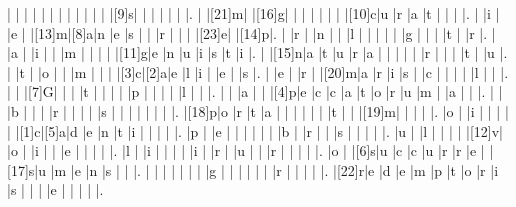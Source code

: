 \documentclass[12pt]{article}
\begin{document}
\begin{Puzzle}{20}{20}
  |{}  |{}  |{}  |{}  |{}  |{}  |{}  |{}  |{}  |{}  |{}  |{}  |[9]s|{}  |{}  |{}  |{}  |{}  |{}  |.
  |{}  |[21]m|{}  |[16]g|{}  |{}  |{}  |{}  |{}  |{}  |{}  |[10]c|u   |r   |a   |t   |{}  |{}  |{}  |.
  |{}  |i   |{}  |e   |{}  |[13]m|[8]a|n   |e   |s   |{}  |{}  |r   |{}  |{}  |{}  |[23]e|{}  |[14]p|.
  |{}  |r   |{}  |n   |{}  |{}  |l   |{}  |{}  |{}  |{}  |{}  |g   |{}  |{}  |{}  |t   |{}  |r   |.
  |{}  |a   |{}  |i   |{}  |{}  |m   |{}  |{}  |{}  |{}  |[11]g|e   |n   |u   |i   |s   |t   |i   |.
  |{}  |[15]n|a   |t   |u   |r   |a   |{}  |{}  |{}  |{}  |{}  |r   |{}  |{}  |{}  |t   |{}  |u   |.
  |{}  |t   |{}  |o   |{}  |{}  |m   |{}  |{}  |{}  |[3]c|[2]a|e   |l   |i   |{}  |e   |{}  |s   |.
  |{}  |e   |{}  |r   |{}  |[20]m|a   |r   |i   |s   |{}  |c   |{}  |{}  |{}  |{}  |l   |{}  |{}  |.
  |{}  |{}  |[7]G|{}  |{}  |{}  |t   |{}  |{}  |{}  |{}  |p   |{}  |{}  |{}  |{}  |l   |{}  |{}  |.
  |{}  |{}  |a   |{}  |{}  |[4]p|e   |c   |c   |a   |t   |o   |r   |u   |m   |{}  |a   |{}  |{}  |.
  |{}  |{}  |b   |{}  |{}  |{}  |r   |{}  |{}  |{}  |{}  |s   |{}  |{}  |{}  |{}  |{}  |{}  |{}  |.
  |[18]p|o   |r   |t   |a   |{}  |{}  |{}  |{}  |{}  |{}  |t   |{}  |{}  |[19]m|{}  |{}  |{}  |{}  |.
  |o   |{}  |i   |{}  |{}  |{}  |{}  |{}  |[1]c|[5]a|d   |e   |n   |t   |i   |{}  |{}  |{}  |{}  |.
  |p   |{}  |e   |{}  |{}  |{}  |{}  |{}  |{}  |b   |{}  |r   |{}  |{}  |s   |{}  |{}  |{}  |{}  |.
  |u   |{}  |l   |{}  |{}  |{}  |{}  |[12]v|{}  |o   |{}  |i   |{}  |{}  |e   |{}  |{}  |{}  |{}  |.
  |l   |{}  |i   |{}  |{}  |{}  |{}  |i   |{}  |r   |{}  |u   |{}  |{}  |r   |{}  |{}  |{}  |{}  |.
  |o   |{}  |[6]s|u   |c   |c   |u   |r   |r   |e   |{}  |[17]s|u   |m   |e   |n   |s   |{}  |{}  |.
  |{}  |{}  |{}  |{}  |{}  |{}  |{}  |g   |{}  |{}  |{}  |{}  |{}  |{}  |r   |{}  |{}  |{}  |{}  |.
  |[22]r|e   |d   |e   |m   |p   |t   |o   |r   |i   |s   |{}  |{}  |{}  |e   |{}  |{}  |{}  |{}  |.
\end{Puzzle}
\end{document}

